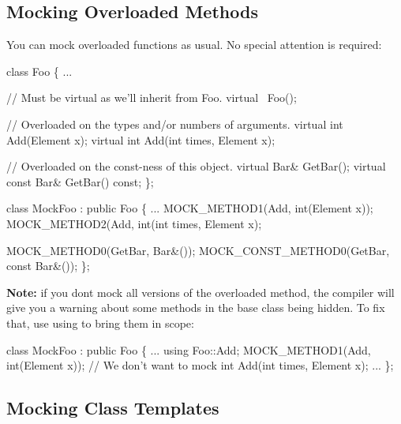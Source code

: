 \subsection*{Mocking Overloaded Methods}

You can mock overloaded functions as usual. No special attention is required\+:


\begin{DoxyCode}
\textcolor{keyword}{class }Foo \{
  ...

  \textcolor{comment}{// Must be virtual as we'll inherit from Foo.}
  \textcolor{keyword}{virtual} ~Foo();

  \textcolor{comment}{// Overloaded on the types and/or numbers of arguments.}
  \textcolor{keyword}{virtual} \textcolor{keywordtype}{int} Add(Element x);
  \textcolor{keyword}{virtual} \textcolor{keywordtype}{int} Add(\textcolor{keywordtype}{int} times, Element x);

  \textcolor{comment}{// Overloaded on the const-ness of this object.}
  \textcolor{keyword}{virtual} Bar& GetBar();
  \textcolor{keyword}{virtual} \textcolor{keyword}{const} Bar& GetBar() \textcolor{keyword}{const};
\};

\textcolor{keyword}{class }MockFoo : \textcolor{keyword}{public} Foo \{
  ...
  MOCK\_METHOD1(Add, \textcolor{keywordtype}{int}(Element x));
  MOCK\_METHOD2(Add, \textcolor{keywordtype}{int}(\textcolor{keywordtype}{int} times, Element x);

  MOCK\_METHOD0(GetBar, Bar&());
  MOCK\_CONST\_METHOD0(GetBar, \textcolor{keyword}{const} Bar&());
\};
\end{DoxyCode}


{\bfseries Note\+:} if you don\textquotesingle{}t mock all versions of the overloaded method, the compiler will give you a warning about some methods in the base class being hidden. To fix that, use {\ttfamily using} to bring them in scope\+:


\begin{DoxyCode}
\textcolor{keyword}{class }MockFoo : \textcolor{keyword}{public} Foo \{
  ...
  \textcolor{keyword}{using} Foo::Add;
  MOCK\_METHOD1(Add, \textcolor{keywordtype}{int}(Element x));
  \textcolor{comment}{// We don't want to mock int Add(int times, Element x);}
  ...
\};
\end{DoxyCode}


\subsection*{Mocking Class Templates}

